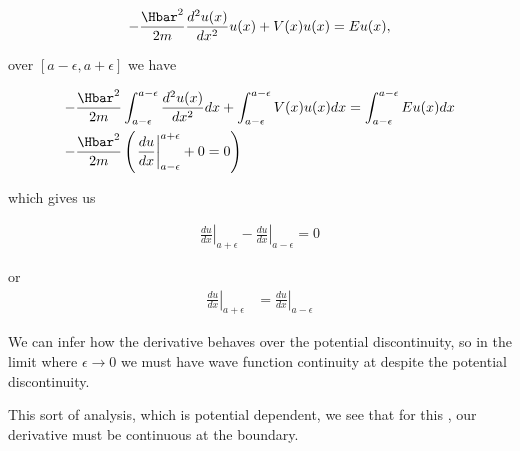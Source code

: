 {\begin{equation}\label{eqn:PHY356Lecture9:20}
\begin{aligned}
-\frac{\Hbar^2 }{2m} \frac{d^2 u(x)}{dx^2} u(x) + V(x) u(x) = E u(x),
\end{aligned}
\end{equation}

over \([a-\epsilon,a+\epsilon]\) we have

\begin{equation}\label{eqn:PHY356Lecture9:21}
\begin{aligned}
-\frac{\Hbar^2 }{2m} &
\int_{a-\epsilon}^{a-\epsilon}
\frac{d^2 u(x)}{dx^2} dx
+
\int_{a-\epsilon}^{a-\epsilon}
V(x) u(x) dx =
\int_{a-\epsilon}^{a-\epsilon}
E u(x) dx \\
-\frac{\Hbar^2 }{2m} &
\left(
\left.\frac{du}{dx}\right\vert_{a-\epsilon}^{a+\epsilon} + 0 = 0
\right)
\end{aligned}
\end{equation}

which gives us

\begin{equation}\label{eqn:PHY356Lecture9:22}
\begin{aligned}
\left.\frac{du}{dx}\right\vert_{a + \epsilon}
-\left.\frac{du}{dx}\right\vert_{a - \epsilon} = 0
\end{aligned}
\end{equation}

or
\begin{equation}\label{eqn:PHY356Lecture9:23}
\begin{aligned}
\left.\frac{du}{dx}\right\vert_{a + \epsilon}
&=
\left.\frac{du}{dx}\right\vert_{a - \epsilon}
\end{aligned}
\end{equation}

We can infer how the derivative behaves over the potential discontinuity, so in the limit where \(\epsilon \rightarrow 0\) we must have wave function continuity at despite the potential discontinuity.

This sort of analysis, which is potential dependent, we see that for this , our derivative must be continuous at the boundary.

} %

